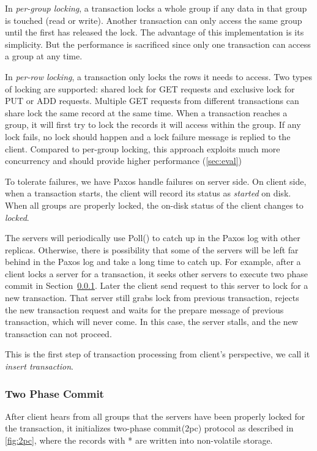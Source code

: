 \documentclass{vldb}
\begin{document}
In \textit{per-group locking}, a transaction locks a whole group if 
any data in that group is touched (read or write). Another transaction 
can only access the same group until the first has released the lock.  
The advantage of this implementation is its simplicity. But the 
performance is sacrificed since only one transaction can access a 
group at any time. 

In \textit{per-row locking}, a transaction only locks the rows it 
needs to access. Two types of locking are supported: shared lock for 
GET requests and exclusive lock for PUT or ADD requests. Multiple GET 
requests from different transactions can share lock the same record at 
the same time. When a transaction reaches a group, it will first try 
to lock the records it will access within the group. If any lock 
fails, no lock should happen and a lock failure message is replied to 
the client. Compared to per-group locking, this approach exploits much 
more concurrency and should provide higher performance 
(\cref{sec:eval})

To tolerate failures, we have Paxos handle failures on server side. On 
client side, when a transaction starts, the client will record its 
status as \textit{started} on disk. When all groups are properly 
locked, the on-disk status of the client changes to \textit{locked}.

The servers will periodically use Poll() to catch up in the Paxos log 
with other replicas. Otherwise, there is possibility that some of the 
servers will be left far behind in the Paxos log and take a long time 
to catch up. For example, after a client locks a server for a 
transaction, it seeks other servers to execute two phase commit in
Section~\ref{sec:2pc}. Later the client send request to this server to 
lock for a new transaction. That server still grabs lock from previous 
transaction, rejects the new transaction request and waits for the 
prepare message of previous transaction, which will never come. In 
this case, the server stalls, and the new transaction can not
proceed.

This is the first step of transaction processing from client's 
perspective, we call it \textit{insert transaction}.

\subsubsection{Two Phase Commit}
\label{sec:2pc}

After client hears from all groups that the servers have been properly 
locked for the transaction, it initializes two-phase commit(2pc) 
protocol\cite{mohan86} as described in \cref{fig:2pc}, where the records with 
* are written into non-volatile storage.
\end{document}
